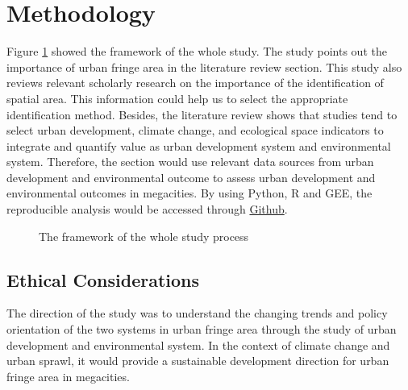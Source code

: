 \section{Methodology} 
Figure \ref{structure} showed the framework of the whole study. The study points out the importance of urban fringe area in the literature review section. This study also reviews relevant scholarly research on the importance of the identification of spatial area. This information could help us to select the appropriate identification method. Besides, the literature review shows that studies tend to select urban development, climate change, and ecological space indicators to integrate and quantify value as urban development system and environmental system. Therefore, the section would use relevant data sources from urban development and environmental outcome to assess urban development and environmental outcomes in megacities. By using Python, R and GEE, the reproducible analysis would be accessed through \href{https://github.com/Jackeytanlor/CASA_Dissertation/blob/main/code/GEE_NDVI}{Github}.\\
\begin{figure}[h]
\centering
{}
\caption{The framework of the whole study process}
\label{structure}
\end{figure}

\subsection{Ethical Considerations}
The direction of the study was to understand the changing trends and policy orientation of the two systems in urban fringe area through the study of urban development and environmental system. In the context of climate change and urban sprawl, it would provide a sustainable development direction for urban fringe area in megacities.\\

